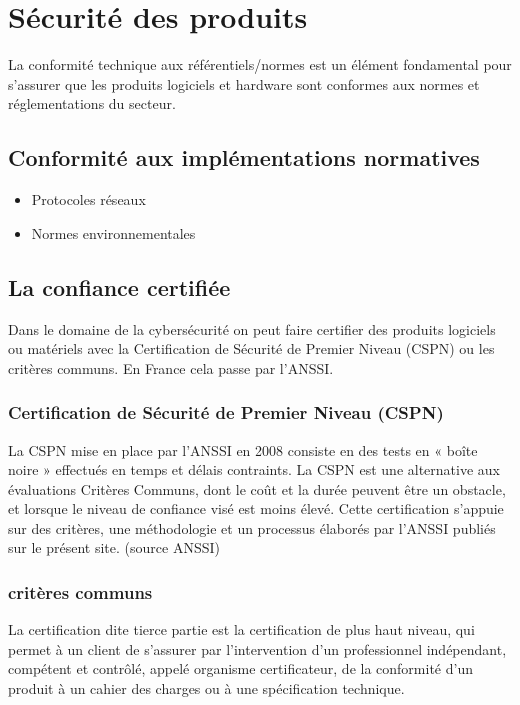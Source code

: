 \section{Sécurité des produits}

La conformité technique aux référentiels/normes est un élément fondamental pour s'assurer que les produits logiciels et hardware sont conformes aux normes et réglementations du secteur.

\subsection{Conformité aux implémentations normatives}
\begin{itemize}
	\item Protocoles réseaux
	\item Normes environnementales
\end{itemize}

\subsection{La confiance certifiée}

Dans le domaine de la cybersécurité on peut faire certifier des produits logiciels ou matériels avec la Certification de Sécurité de Premier Niveau (CSPN) ou les critères communs. En France cela passe par l'ANSSI.

\subsubsection{Certification de Sécurité de Premier Niveau (CSPN)}
La CSPN mise en place par l’ANSSI en 2008 consiste en des tests en « boîte noire » effectués en temps et délais contraints. La CSPN est une alternative aux évaluations Critères Communs, dont le coût et la durée peuvent être un obstacle, et lorsque le niveau de confiance visé est moins élevé. Cette certification s’appuie sur des critères, une méthodologie et un processus élaborés par l’ANSSI publiés sur le présent site.
(source ANSSI)

\subsubsection{critères communs}
La certification dite tierce partie est la certification de plus haut niveau, qui permet à un client de s’assurer par l’intervention d’un professionnel indépendant, compétent et contrôlé, appelé organisme certificateur, de la conformité d’un produit à un cahier des charges ou à une spécification technique. 

